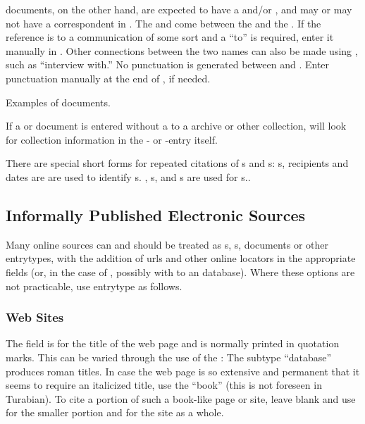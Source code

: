 \documentclass{ltxdockit}[2010/02/12]
\begin{document}
 documents, on the other hand, are expected to have a  and/or , and may or may not have a correspondent in . The  and come between the  and the .  If the reference is to a communication of some sort and a ``to'' is required, enter it manually in . Other connections between the two names can also be made using , such as ``interview with.'' No punctuation is generated between  and . Enter punctuation manually at the end of , if needed.


Examples of  documents.\autocites[][]{1549,weismann1877pultkalender,weismann1887dezember-neapel,kammerer1920entwicklungsmec}

If a  or  document is entered without a  to a  archive or other collection,  will look for collection information in the - or -entry itself.


There are special short forms for repeated citations of s and s:\label{lettershortform}
s, recipients and dates are are used to identify s. ,  s, and s are used for s.\autocites[][]{1607, 1911, 1549}. 


\subsection{Informally Published Electronic Sources}
Many online sources can and should be treated as s, s,  documents or other entrytypes, with the addition of urls and other online locators in the appropriate fields (or, in the case of , possibly with  to an  database). Where these options are not practicable, use entrytype  as follows.

\subsubsection{Web Sites}\label{websites}
The  field is for the title of the web page and is normally printed in quotation marks. This can be varied through the use of the : The subtype ``database'' produces roman titles.\autocites[][]{sciper-db} In case the web page is so extensive and permanent that it seems to require an italicized title, use the  ``book'' (this is not foreseen in Turabian). To cite a portion of such a book-like page or site, leave  blank and use  for the smaller portion and  for the site as a whole.
\end{document}
